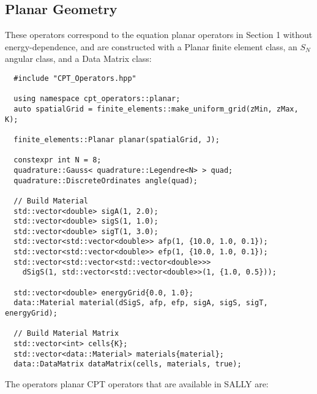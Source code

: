 \documentclass[../main.tex]{subfiles}
\begin{document}
\subsection{Planar Geometry}
These operators correspond to the equation planar operators in Section 1 without energy-dependence, and are constructed with a Planar finite element class, an $S_N$ angular class, and a Data Matrix class:
\begin{verbatim}
  #include "CPT_Operators.hpp"
  
  using namespace cpt_operators::planar;
  auto spatialGrid = finite_elements::make_uniform_grid(zMin, zMax, K);

  finite_elements::Planar planar(spatialGrid, J);

  constexpr int N = 8;
  quadrature::Gauss< quadrature::Legendre<N> > quad;
  quadrature::DiscreteOrdinates angle(quad);

  // Build Material
  std::vector<double> sigA(1, 2.0);
  std::vector<double> sigS(1, 1.0);
  std::vector<double> sigT(1, 3.0);
  std::vector<std::vector<double>> afp(1, {10.0, 1.0, 0.1});
  std::vector<std::vector<double>> efp(1, {10.0, 1.0, 0.1});
  std::vector<std::vector<std::vector<double>>> 
    dSigS(1, std::vector<std::vector<double>>(1, {1.0, 0.5}));

  std::vector<double> energyGrid{0.0, 1.0};
  data::Material material(dSigS, afp, efp, sigA, sigS, sigT, energyGrid);

  // Build Material Matrix
  std::vector<int> cells{K};
  std::vector<data::Material> materials{material};
  data::DataMatrix dataMatrix(cells, materials, true);
\end{verbatim}
The operators planar CPT operators that are available in SALLY are:
\end{document}

